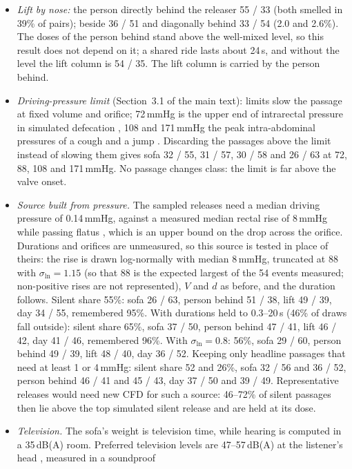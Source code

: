 \documentclass[11pt]{article}
\begin{document}
\begin{itemize}
  \item \emph{Lift by nose:} the person directly behind the releaser 55 / 33 (both smelled in 39\% of pairs); beside
  36 / 51 and diagonally behind 33 / 54 (2.0 and 2.6\%). The doses of the person behind stand above the well-mixed
  level, so this result does not depend on it; a shared ride lasts about 24\,s, and without the level the lift
  column is 54 / 35. The lift column is carried by the person behind.
  \item \emph{Driving-pressure limit} (Section~3.1 of the main text): limits slow the passage at fixed volume and
  orifice; 72\,mmHg is the upper end of intrarectal pressure in simulated defecation \cite{lee2016}, 108 and
  171\,mmHg the peak intra-abdominal pressures of a cough and a jump \cite{cobb2005}. Discarding the passages above
  the limit instead of slowing them gives sofa 32 / 55, 31 / 57, 30 / 58 and 26 / 63 at 72, 88, 108 and 171\,mmHg.
  No passage changes class: the limit is far above the valve onset.
  \item \emph{Source built from pressure.} The sampled releases need a median driving pressure of 0.14\,mmHg, against
  a measured median rectal rise of 8\,mmHg while passing flatus \cite{miller1988b}, which is an upper bound on the
  drop across the orifice. Durations and orifices are unmeasured, so this source is tested in place of theirs: the rise
  is drawn log-normally with median 8\,mmHg, truncated at 88 with $\sigma_{\ln} = 1.15$ (so that 88 is the expected
  largest of the 54 events measured; non-positive rises are not represented), $V$ and $d$ as before, and the duration
  follows. Silent share 55\%: sofa 26 / 63, person behind 51 / 38, lift 49 / 39, day 34 / 55, remembered 95\%. With
  durations held to 0.3--20\,s (46\% of draws fall outside): silent share 65\%, sofa 37 / 50, person behind 47 / 41,
  lift 46 / 42, day 41 / 46, remembered 96\%. With $\sigma_{\ln} = 0.8$: 56\%, sofa 29 / 60, person behind 49 / 39,
  lift 48 / 40, day 36 / 52. Keeping only headline passages that need at least 1 or 4\,mmHg: silent share 52 and 26\%,
  sofa 32 / 56 and 36 / 52, person behind 46 / 41 and 45 / 43, day 37 / 50 and 39 / 49. Representative releases
  would need new CFD for such a source: 46--72\% of silent passages then lie above the top simulated silent release
  and are held at its dose.
  \item \emph{Television.} The sofa's weight is television time, while hearing is computed in a 35\,dB(A) room.
  Preferred television levels are 47--57\,dB(A) at the listener's head \cite{kurakata1999}, measured in a soundproof

\end{itemize}
\end{document}
